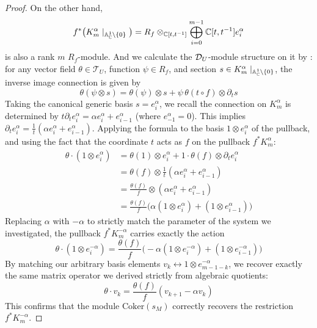 \begin{proof}
    On the other hand,
    \[
        f^*\big( K^\alpha_m\mid_{\mathbb{A}^1_{\mathbb{C}} \setminus \{0\}} \big) = R_f \otimes_{\mathbb{C}[t,t^{-1}]}\bigoplus_{i=0}^{m-1} \mathbb{C}[t, t^{-1}] e^\alpha_i
    \]
    is also a rank $m$ $R_f$-module. And we calculate the $\mathcal{D}_U$-module structure on it by \cite[Sect.~1.3]{hotta2008d}:
    for any vector field $\theta \in \mathcal{T}_U$, function $\psi \in R_f$, and section $s \in K^\alpha_m\mid_{\mathbb{A}^1_{\mathbb{C}} \setminus \{0\}}$, the inverse image connection is given by
    \[
        \theta(\psi \otimes s) = \theta(\psi) \otimes s + \psi \, \theta(t \circ f) \otimes \partial_t s
    \]
    Taking the canonical generic basis $s = e^\alpha_i$, we recall the connection on $K^\alpha_m$ is determined by $t\partial_t e^\alpha_i = \alpha e^\alpha_i + e^\alpha_{i-1}$ (where $e^\alpha_{-1} = 0$).
    This implies $\partial_t e^\alpha_i = \frac{1}{t}(\alpha e^\alpha_i + e^\alpha_{i-1})$.
    Applying the formula to the basis $1 \otimes e^\alpha_i$ of the pullback, and using the fact that the coordinate $t$ acts as $f$ on the pullback $f^* K^\alpha_m$:
    \begin{align*}
        \theta \cdot (1 \otimes e^\alpha_i) & = \theta(1) \otimes e^\alpha_i + 1 \cdot \theta(f) \otimes \partial_t e^\alpha_i             \\
                                            & = \theta(f) \otimes \frac{1}{t}(\alpha e^\alpha_i + e^\alpha_{i-1})                          \\
                                            & = \frac{\theta(f)}{f} \otimes (\alpha e^\alpha_i + e^\alpha_{i-1})                           \\
                                            & = \frac{\theta(f)}{f} \big( \alpha (1 \otimes e^\alpha_i) + (1 \otimes e^\alpha_{i-1}) \big)
    \end{align*}
    Replacing $\alpha$ with $-\alpha$ to strictly match the parameter of the system we investigated, the pullback
    $f^* K^{-\alpha}_m$ carries exactly the action
    \[
        \theta \cdot (1 \otimes e^{-\alpha}_i) = \frac{\theta(f)}{f} \big( -\alpha(1 \otimes e^{-\alpha}_i) + (1 \otimes e^{-\alpha}_{i-1}) \big)
    \]
    By matching our arbitrary basis elements $v_k \leftrightarrow 1 \otimes e^{-\alpha}_{m-1-k}$, we recover exactly the same matrix operator we derived strictly from algebraic quotients:
    \[
        \theta \cdot v_k = \frac{\theta(f)}{f} (v_{k+1} - \alpha v_k)
    \]
    This confirms that the module $\mathrm{Coker}(s_M)$ correctly recovers the restriction $f^* K^{-\alpha}_m$.


\end{proof}
